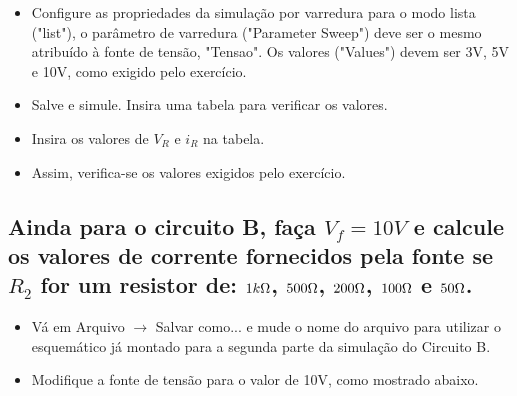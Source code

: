 
\begin{itemize}
    \item Configure as propriedades da simulação por varredura para o modo lista ("list"), o parâmetro de varredura ("Parameter Sweep") deve ser o mesmo atribuído à fonte de tensão, "Tensao". Os valores ("Values") devem ser 3V, 5V e 10V, como exigido pelo exercício.
\end{itemize}


\begin{itemize}
    \item Salve e simule. Insira uma tabela para verificar os valores.
\end{itemize}


\begin{itemize}
    \item Insira os valores de $V_R$ e $i_R$ na tabela.
\end{itemize}


\begin{itemize}
    \item Assim, verifica-se os valores exigidos pelo exercício.
\end{itemize}


\newpage

\subsection{Ainda para o circuito B, faça $V_f = 10 V$ e calcule os valores de corrente fornecidos pela fonte se $R_2$ for um resistor de: $1 k\ohm$,
$500 \ohm$, $200 \ohm$, $100 \ohm$ e $50 \ohm$.}

\begin{itemize}
    \item Vá em Arquivo $\rightarrow$ Salvar como... e mude o nome do
    arquivo para utilizar o esquemático já montado para
    a segunda parte da simulação do Circuito B.

    \item Modifique a fonte de tensão para o valor de 10V, como mostrado abaixo.
\end{itemize}

